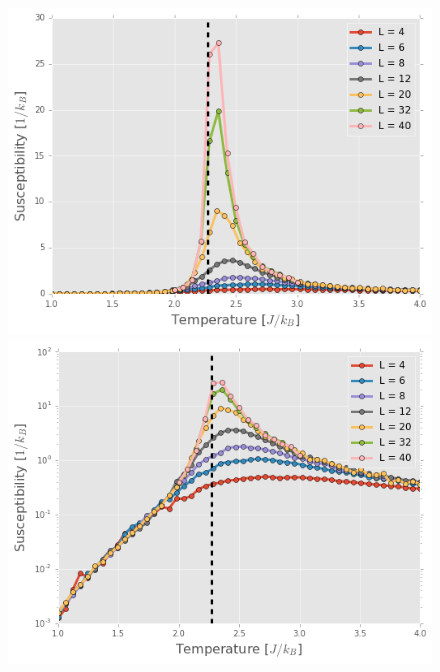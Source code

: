 \documentclass[11pt, oneside]{article}
\begin{document}
\begin{figure}
    \begin{minipage}{0.47\textwidth}
    \includegraphics[width=\linewidth]{img/2D/susc_lin}
    \end{minipage}
    \hspace{\fill} %
    \begin{minipage}{0.47\textwidth}
    \includegraphics[width=\linewidth]{img/2D/susc}
    \end{minipage}

    \vspace*{0cm} %


\end{figure}
\end{document}
